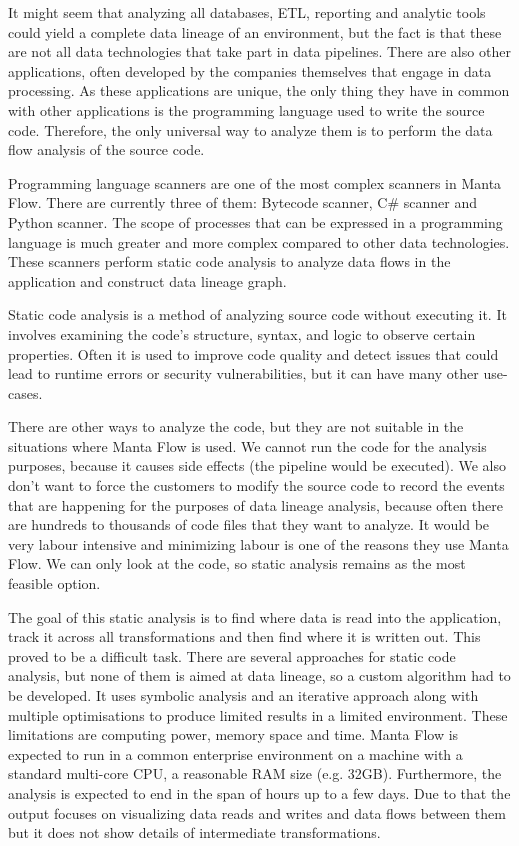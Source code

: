 It might seem that analyzing all databases, ETL, reporting and analytic tools could yield a complete data lineage of an environment, but the fact is that these are not all data technologies that take part in data pipelines. There are also other applications, often developed by the companies themselves that engage in data processing. As these applications are unique, the only thing they have in common with other applications is the programming language used to write the source code. Therefore, the only universal way to analyze them is to perform the data flow analysis of the source code.
\par
Programming language scanners are one of the most complex scanners in Manta Flow. There are currently three of them: Bytecode scanner, C\# scanner and Python scanner. The scope of processes that can be expressed in a programming language is much greater and more complex compared to other data technologies. These scanners perform static code analysis to analyze data flows in the application and construct data lineage graph.
\par
Static code analysis is a method of analyzing source code without executing it. It involves examining the code's structure, syntax, and logic to observe certain properties. Often it is used to improve code quality and detect issues that could lead to runtime errors or security vulnerabilities, but it can have many other use-cases.
\par
There are other ways to analyze the code, but they are not suitable in the situations where Manta Flow is used. We cannot run the code for the analysis purposes, because it causes side effects (the pipeline would be executed). We also don't want to force the customers to modify the source code to record the events that are happening for the purposes of data lineage analysis, because often there are hundreds to thousands of code files that they want to analyze. It would be very labour intensive and minimizing labour is one of the reasons they use Manta Flow. We can only look at the code, so static analysis remains as the most feasible option.
\par
The goal of this static analysis is to find where data is read into the application, track it across all transformations and then find where it is written out. This proved to be a difficult task. There are several approaches for static code analysis, but none of them is aimed at data lineage, so a custom algorithm had to be developed. It uses symbolic analysis and an iterative approach along with multiple optimisations to produce limited results in a limited environment. These limitations are computing power, memory space and time. Manta Flow is expected to run in a common enterprise environment on a machine with a standard multi-core CPU, a reasonable RAM size (e.g. 32GB). Furthermore, the analysis is expected to end in the span of hours up to a few days. Due to that the output focuses on visualizing data reads and writes and data flows between them but it does not show details of intermediate transformations.

